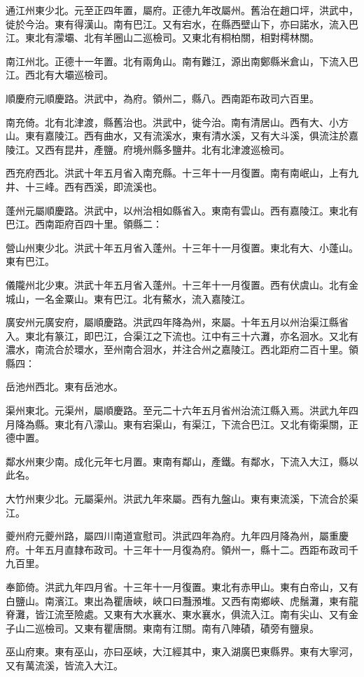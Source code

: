 通江州東少北。元至正四年置，屬府。正德九年改屬州。舊治在趙口坪，洪武中，徙於今治。東有得漢山。南有巴江。又有宕水，在縣西壁山下，亦曰諾水，流入巴江。東北有濛壩、北有羊圈山二巡檢司。又東北有桐柏關，相對樗林關。

南江州北。正德十一年置。北有兩角山。南有難江，源出南鄭縣米倉山，下流入巴江。西北有大壩巡檢司。

順慶府元順慶路。洪武中，為府。領州二，縣八。西南距布政司六百里。

南充倚。北有北津渡，縣舊治也。洪武中，徙今治。南有清居山。西有大、小方山。東有嘉陵江。西有曲水，又有流溪水，東有清水溪，又有大斗溪，俱流注於嘉陵江。又西有昆井，產鹽。府境州縣多鹽井。北有北津渡巡檢司。

西充府西北。洪武十年五月省入南充縣。十三年十一月復置。南有南岷山，上有九井、十三峰。西有西溪，即流溪也。

蓬州元屬順慶路。洪武中，以州治相如縣省入。東南有雲山。西有嘉陵江。東北有巴江。西南距府百四十里。領縣二：

營山州東少北。洪武十年五月省入蓬州。十三年十一月復置。東北有大、小蓬山。東有巴江。

儀隴州北少東。洪武十年五月省入蓬州。十三年十一月復置。西有伏虞山。北有金城山，一名金粟山。東有巴江。北有鰲水，流入嘉陵江。

廣安州元廣安府，屬順慶路。洪武四年降為州，來屬。十年五月以州治渠江縣省入。東北有篆江，即巴江，合渠江之下流也。江中有三十六灘，亦名洄水。又北有濃水，南流合於環水，至州南合洄水，并注合州之嘉陵江。西北距府二百十里。領縣四：

岳池州西北。東有岳池水。

渠州東北。元渠州，屬順慶路。至元二十六年五月省州治流江縣入焉。洪武九年四月降為縣。東北有八濛山。東有宕渠山，有渠江，下流合巴江。又北有衛渠關，正德中置。

鄰水州東少南。成化元年七月置。東南有鄰山，產鐵。有鄰水，下流入大江，縣以此名。

大竹州東少北。元屬渠州。洪武九年來屬。西有九盤山。東有東流溪，下流合於渠江。

夔州府元夔州路，屬四川南道宣慰司。洪武四年為府。九年四月降為州，屬重慶府。十年五月直隸布政司。十三年十一月復為府。領州一，縣十二。西距布政司千九百里。

奉節倚。洪武九年四月省。十三年十一月復置。東北有赤甲山。東有白帝山，又有白鹽山。南濱江。東出為瞿唐峽，峽口曰灩澦堆。又西有南鄉峽、虎鬚灘，東有龍脊灘，皆江流至險處。又東有大水襄水、東水襄水，俱流入江。南有尖山、又有金子山二巡檢司。又東有瞿唐關。東南有江關。南有八陣磧，磧旁有鹽泉。

巫山府東。東有巫山，亦曰巫峽，大江經其中，東入湖廣巴東縣界。東有大寧河，又有萬流溪，皆流入大江。

